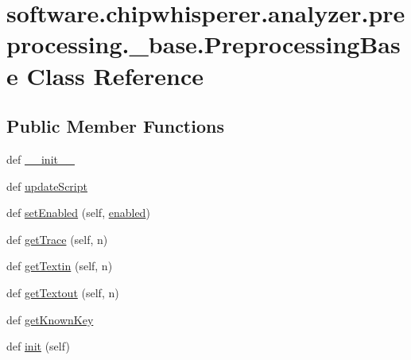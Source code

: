 \hypertarget{classsoftware_1_1chipwhisperer_1_1analyzer_1_1preprocessing_1_1__base_1_1PreprocessingBase}{}\section{software.\+chipwhisperer.\+analyzer.\+preprocessing.\+\_\+base.\+Preprocessing\+Base Class Reference}
\label{classsoftware_1_1chipwhisperer_1_1analyzer_1_1preprocessing_1_1__base_1_1PreprocessingBase}
\subsection*{Public Member Functions}
\begin{DoxyCompactItemize}
\item 
def \hyperlink{classsoftware_1_1chipwhisperer_1_1analyzer_1_1preprocessing_1_1__base_1_1PreprocessingBase_a43ff7638d5399e5fb72cf9d2bda17b74}{\+\_\+\+\_\+init\+\_\+\+\_\+}
\item 
def \hyperlink{classsoftware_1_1chipwhisperer_1_1analyzer_1_1preprocessing_1_1__base_1_1PreprocessingBase_a8f1add186cf310162dc2dc547ca7c673}{update\+Script}
\item 
def \hyperlink{classsoftware_1_1chipwhisperer_1_1analyzer_1_1preprocessing_1_1__base_1_1PreprocessingBase_a953d83422ff476e8ab26758e89d23f24}{set\+Enabled} (self, \hyperlink{classsoftware_1_1chipwhisperer_1_1analyzer_1_1preprocessing_1_1__base_1_1PreprocessingBase_ae665d04fcffe5a72f76fb88c4e0f9aaa}{enabled})
\item 
def \hyperlink{classsoftware_1_1chipwhisperer_1_1analyzer_1_1preprocessing_1_1__base_1_1PreprocessingBase_a67bee0053da84ff226f88331141f88d8}{get\+Trace} (self, n)
\item 
def \hyperlink{classsoftware_1_1chipwhisperer_1_1analyzer_1_1preprocessing_1_1__base_1_1PreprocessingBase_a383263b764a4b4a25611ab8973486611}{get\+Textin} (self, n)
\item 
def \hyperlink{classsoftware_1_1chipwhisperer_1_1analyzer_1_1preprocessing_1_1__base_1_1PreprocessingBase_a12dd4307b279451b72450ad2479d4fad}{get\+Textout} (self, n)
\item 
def \hyperlink{classsoftware_1_1chipwhisperer_1_1analyzer_1_1preprocessing_1_1__base_1_1PreprocessingBase_a894f01b7b6122e929d9294373e7cfc51}{get\+Known\+Key}
\item 
def \hyperlink{classsoftware_1_1chipwhisperer_1_1analyzer_1_1preprocessing_1_1__base_1_1PreprocessingBase_a45d799a8f734677f3576f2f5f8337f54}{init} (self)

\end{DoxyCompactItemize}
